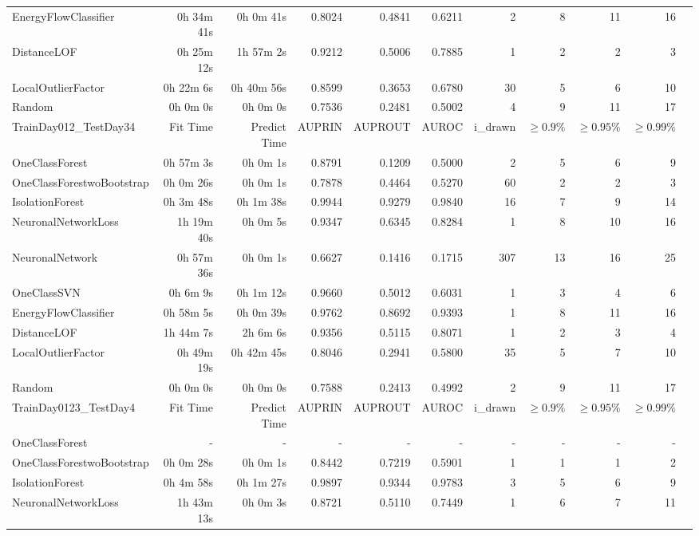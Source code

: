 \documentclass{article}
\begin{document}
\begin{table*}[t]
\begin{tabular}{lrrrrrrrrrr}
EnergyFlowClassifier & 0h 34m 41s & 0h 0m 41s & 0.8024 & 0.4841 & 0.6211 & 2 & 8 & 11 & 16 \\
DistanceLOF & 0h 25m 12s & 1h 57m 2s & 0.9212 & 0.5006 & 0.7885 & 1 & 2 & 2 & 3 \\
LocalOutlierFactor & 0h 22m 6s & 0h 40m 56s & 0.8599 & 0.3653 & 0.6780 & 30 & 5 & 6 & 10 \\
Random & 0h 0m 0s & 0h 0m 0s & 0.7536 & 0.2481 & 0.5002 & 4 & 9 & 11 & 17 \\
\midrule
TrainDay012\_TestDay34 & Fit Time & Predict Time & AUPRIN & AUPROUT & AUROC & i\_drawn & $\geq 0.9\%$ & $\geq 0.95\%$ & $\geq 0.99\%$ \\
\midrule
OneClassForest & 0h 57m 3s & 0h 0m 1s & 0.8791 & 0.1209 & 0.5000 & 2 & 5 & 6 & 9 \\
OneClassForestwoBootstrap & 0h 0m 26s & 0h 0m 1s & 0.7878 & 0.4464 & 0.5270 & 60 & 2 & 2 & 3 \\
IsolationForest & 0h 3m 48s & 0h 1m 38s & 0.9944 & 0.9279 & 0.9840 & 16 & 7 & 9 & 14 \\
NeuronalNetworkLoss & 1h 19m 40s & 0h 0m 5s & 0.9347 & 0.6345 & 0.8284 & 1 & 8 & 10 & 16 \\
NeuronalNetwork & 0h 57m 36s & 0h 0m 1s & 0.6627 & 0.1416 & 0.1715 & 307 & 13 & 16 & 25 \\
OneClassSVN & 0h 6m 9s & 0h 1m 12s & 0.9660 & 0.5012 & 0.6031 & 1 & 3 & 4 & 6 \\
EnergyFlowClassifier & 0h 58m 5s & 0h 0m 39s & 0.9762 & 0.8692 & 0.9393 & 1 & 8 & 11 & 16 \\
DistanceLOF & 1h 44m 7s & 2h 6m 6s & 0.9356 & 0.5115 & 0.8071 & 1 & 2 & 3 & 4 \\
LocalOutlierFactor & 0h 49m 19s & 0h 42m 45s & 0.8046 & 0.2941 & 0.5800 & 35 & 5 & 7 & 10 \\
Random & 0h 0m 0s & 0h 0m 0s & 0.7588 & 0.2413 & 0.4992 & 2 & 9 & 11 & 17 \\
\midrule
TrainDay0123\_TestDay4 & Fit Time & Predict Time & AUPRIN & AUPROUT & AUROC & i\_drawn & $\geq 0.9\%$ & $\geq 0.95\%$ & $\geq 0.99\%$ \\
\midrule
OneClassForest & - & - & - & - & - & - & - & - & - \\
OneClassForestwoBootstrap & 0h 0m 28s & 0h 0m 1s & 0.8442 & 0.7219 & 0.5901 & 1 & 1 & 1 & 2 \\
IsolationForest & 0h 4m 58s & 0h 1m 27s & 0.9897 & 0.9344 & 0.9783 & 3 & 5 & 6 & 9 \\
NeuronalNetworkLoss & 1h 43m 13s & 0h 0m 3s & 0.8721 & 0.5110 & 0.7449 & 1 & 6 & 7 & 11 \\

\end{tabular}
\end{table*}
\end{document}
